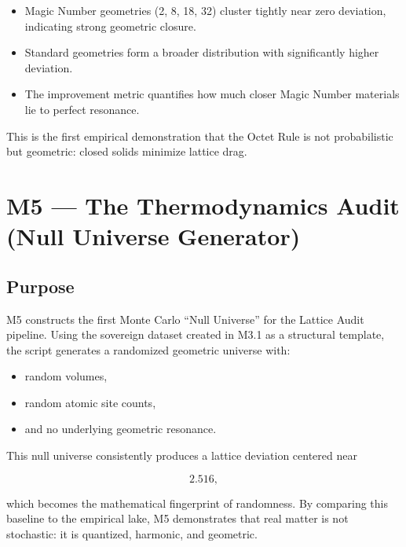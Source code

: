 \documentclass[11pt, letterpaper, openany]{book}
\begin{document}
\begin{itemize}
    \item Magic Number geometries (2, 8, 18, 32) cluster tightly near zero
          deviation, indicating strong geometric closure.
    \item Standard geometries form a broader distribution with significantly
          higher deviation.
    \item The improvement metric quantifies how much closer Magic Number
          materials lie to perfect resonance.
\end{itemize}

This is the first empirical demonstration that the Octet Rule is not probabilistic
but geometric: closed solids minimize lattice drag.


\section{M5 — The Thermodynamics Audit (Null Universe Generator)}

\subsection*{Purpose}
M5 constructs the first Monte Carlo ``Null Universe'' for the Lattice Audit
pipeline. Using the sovereign dataset created in M3.1 as a structural template,
the script generates a randomized geometric universe with:

\begin{itemize}
    \item random volumes,
    \item random atomic site counts,
    \item and no underlying geometric resonance.
\end{itemize}

This null universe consistently produces a lattice deviation centered near


\[
    2.516,
\]


which becomes the mathematical fingerprint of randomness.  
By comparing this baseline to the empirical lake, M5 demonstrates that real
matter is not stochastic: it is quantized, harmonic, and geometric.
\end{document}
